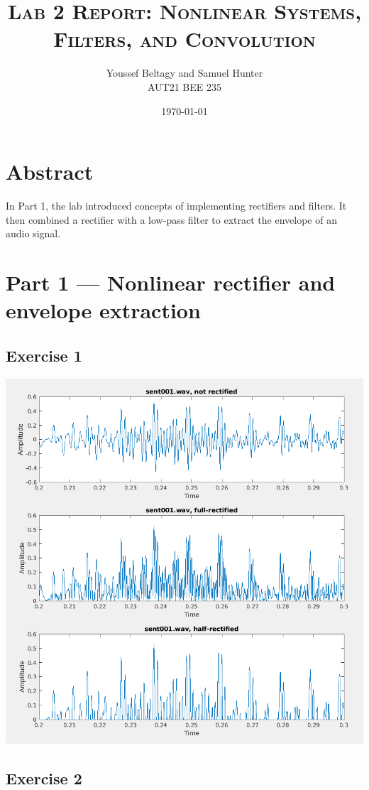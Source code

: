 \documentclass[11pt]{article}
\title{
    \textsc{Lab 2 Report: Nonlinear Systems, Filters, and Convolution}
}
\author{
    \Large{Youssef Beltagy and Samuel Hunter} \\
    \large \textsc{AUT21 BEE 235}
}
\date{\today}
\begin{document}
\maketitle %
\pagebreak


\section{Abstract}

In Part 1, the lab introduced concepts of implementing rectifiers and filters.
It then combined a rectifier with a low-pass filter to extract the envelope of an audio signal.

\section{Part 1 --- Nonlinear rectifier and envelope extraction}

\subsection{Exercise 1}



\includegraphics[width=\textwidth]{exercise1.png}

\subsection{Exercise 2}
\end{document}
